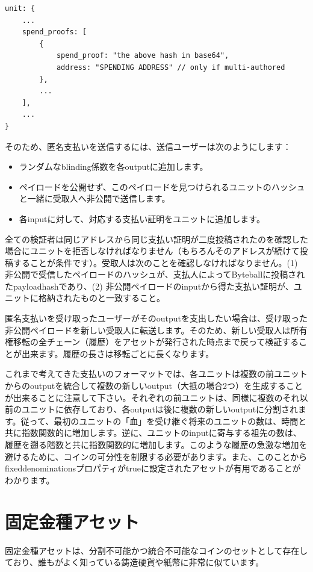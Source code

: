 \documentclass[a4paper, dvipdfmx]{jsarticle}
\begin{document}
\begin{lstlisting}[basicstyle=\ttfamily\footnotesize, frame=none]
unit: {
    ...
    spend_proofs: [
        {
            spend_proof: "the above hash in base64",
            address: "SPENDING ADDRESS" // only if multi-authored
        },
        ...
    ],
    ...
}
\end{lstlisting}

そのため、匿名支払いを送信するには、送信ユーザーは次のようにします：
\begin{itemize}
    \item ランダムなblinding係数を各outputに追加します。
    \item ペイロードを公開せず、このペイロードを見つけられるユニットのハッシュと一緒に受取人へ非公開で送信します。
    \item 各inputに対して、対応する支払い証明をユニットに追加します。
\end{itemize}

全ての検証者は同じアドレスから同じ支払い証明が二度投稿されたのを確認した場合にユニットを拒否しなければなりません（もちろんそのアドレスが続けて投稿することが条件です）。受取人は次のことを確認しなければなりません。(1) 非公開で受信したペイロードのハッシュが、支払人によってByteballに投稿されたpayload\textunderscore hashであり、(2) 非公開ペイロードのinputから得た支払い証明が、ユニットに格納されたものと一致すること。

匿名支払いを受け取ったユーザーがそのoutputを支出したい場合は、受け取った非公開ペイロードを新しい受取人に転送します。そのため、新しい受取人は所有権移転の全チェーン（履歴）をアセットが発行された時点まで戻って検証することが出来ます。履歴の長さは移転ごとに長くなります。

これまで考えてきた支払いのフォーマットでは、各ユニットは複数の前ユニットからのoutputを統合して複数の新しいoutput（大抵の場合2つ）を生成することが出来ることに注意して下さい。それぞれの前ユニットは、同様に複数のそれ以前のユニットに依存しており、各outputは後に複数の新しいoutputに分割されます。従って、最初のユニットの「血」を受け継ぐ将来のユニットの数は、時間と共に指数関数的に増加します。逆に、ユニットのinputに寄与する祖先の数は、履歴を遡る階数と共に指数関数的に増加します。このような履歴の急激な増加を避けるために、コインの可分性を制限する必要があります。また、このことからfixed\textunderscore denominationsプロパティがtrueに設定されたアセットが有用であることがわかります。

\section{固定金種アセット}
固定金種アセットは、分割不可能かつ統合不可能なコインのセットとして存在しており、誰もがよく知っている鋳造硬貨や紙幣に非常に似ています。
\end{document}
